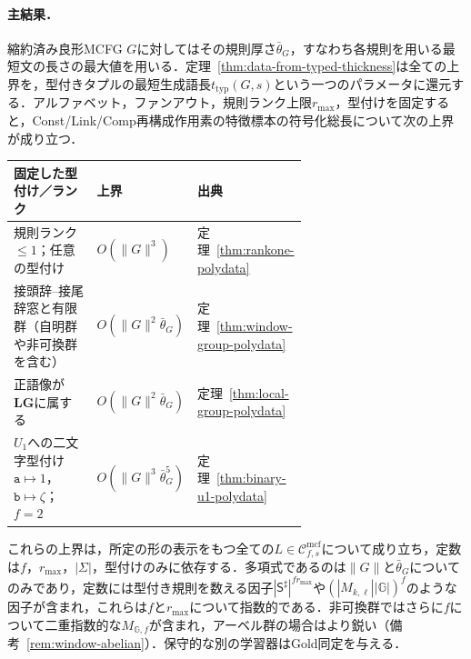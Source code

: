 \documentclass[11pt,a4paper]{ltjsarticle}
\numberwithin{equation}{section}
\theoremstyle{plain}
\theoremstyle{definition}
\theoremstyle{remark}
\newcommand{\Cmcf}[2]{\mathcal{C}^{\mathrm{mcf}}_{#1,#2}}
\begin{document}
\paragraph{主結果．}
縮約済み良形MCFG $G$に対してはその規則厚さ$\bar\theta_G$，すなわち各規則を用いる最短文の長さの最大値を用いる．定理~\ref{thm:data-from-typed-thickness}は全ての上界を，型付きタプルの最短生成語長$t_{\mathrm{typ}}(G,s)$という一つのパラメータに還元する．アルファベット，ファンアウト，規則ランク上限$r_{\max}$，型付けを固定すると，Const/Link/Comp再構成作用素の特徴標本の符号化総長について次の上界が成り立つ．

\begin{center}
\footnotesize
\setlength{\tabcolsep}{3pt}
\renewcommand{\arraystretch}{1.15}
\begin{tabularx}{\linewidth}{@{}p{0.42\linewidth}p{0.22\linewidth}X@{}}
\hline
固定した型付け／ランク & 上界 & 出典\\
\hline
規則ランク$\le1$；任意の型付け
 & $O(\|G\|^3)$ & 定理~\ref{thm:rankone-polydata}\\
接頭辞--接尾辞窓と有限群（自明群や非可換群を含む）
 & $O(\|G\|^2\bar\theta_G)$ & 定理~\ref{thm:window-group-polydata}\\
正語像が$\mathbf{LG}$に属する
 & $O(\|G\|^2\bar\theta_G)$ & 定理~\ref{thm:local-group-polydata}\\
$U_1$への二文字型付け$\mathtt a\mapsto1$，$\mathtt b\mapsto\zeta$；$f=2$
 & $O(\|G\|^3\bar\theta_G^5)$ & 定理~\ref{thm:binary-u1-polydata}\\
\hline
\end{tabularx}
\end{center}

\noindent
これらの上界は，所定の形の表示をもつ全ての$L\in\Cmcf{f}{s}$について成り立ち，定数は$f$，$r_{\max}$，$|\Sigma|$，型付けのみに依存する．多項式であるのは$\|G\|$と$\bar\theta_G$についてのみであり，定数には型付き規則を数える因子$|\mathsf S^\sharp|^{fr_{\max}}$や$(|M_{k,\ell}||\mathbb G|)^f$のような因子が含まれ，これらは$f$と$r_{\max}$について指数的である．非可換群ではさらに$f$について二重指数的な$M_{\mathbb G,f}$が含まれ，アーベル群の場合はより鋭い（備考~\ref{rem:window-abelian}）．保守的な別の学習器はGold同定を与える．
\end{document}
